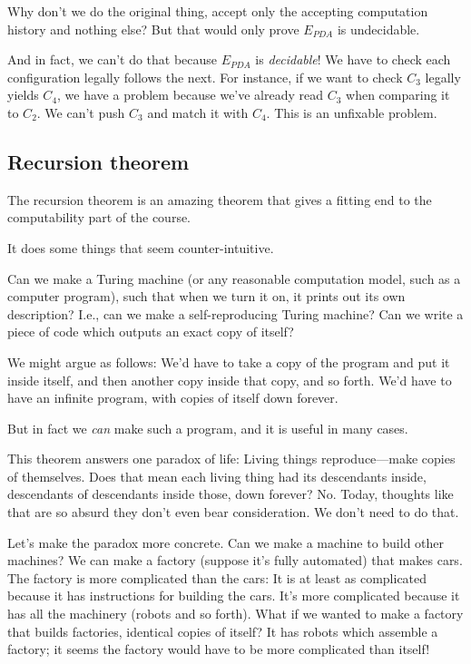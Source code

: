 \begin{rem}
Why don't we do the original thing, accept only the accepting computation history and nothing else? But that would only prove $E_{PDA}$ is  undecidable. %

And in fact, we can't do that because $E_{PDA}$ is {\it decidable}! We have to check each configuration legally follows the next. For instance, if we want to check $C_3$ legally yields $C_4$, we have a problem because we've already read $C_3$ when comparing it to $C_2$. We can't push $C_3$ and match it with $C_4$. This is an unfixable problem.
\end{rem}
\subsection{Recursion theorem}
The recursion theorem is an amazing %
theorem that gives a fitting end to the computability part of the course.

It does some things that seem counter-intuitive.

Can we make a Turing machine (or any reasonable computation model, such as a computer program), such that when we turn it on, it prints out its own description? I.e., can we make a self-reproducing Turing machine? Can we write a piece of code which outputs an exact copy of itself?

We might argue as follows: We'd have to take a copy of the program and put it inside itself, and then another copy inside that copy, and so forth. We'd have to have an infinite program, with copies of itself down forever. %

But in fact we {\it can} make such a program, and it is useful in many cases.

This theorem answers one paradox of life: Living things reproduce---make copies of themselves. Does that mean each living thing had its descendants inside, descendants of descendants inside those, down forever? No. Today, thoughts like that are so absurd they don't even bear consideration. We don't need to do that. 

Let's make the paradox more concrete. %
Can we make a machine to build other machines? We can make a factory (suppose it's fully automated) that makes cars. The factory is more complicated than the cars: It is at least as complicated because it has instructions for building the cars. It's more complicated because it has all the machinery (robots and so forth). What if we wanted to make a factory that builds factories, identical copies of itself? It has robots which assemble a factory; it seems the factory would have to be more complicated than itself!

